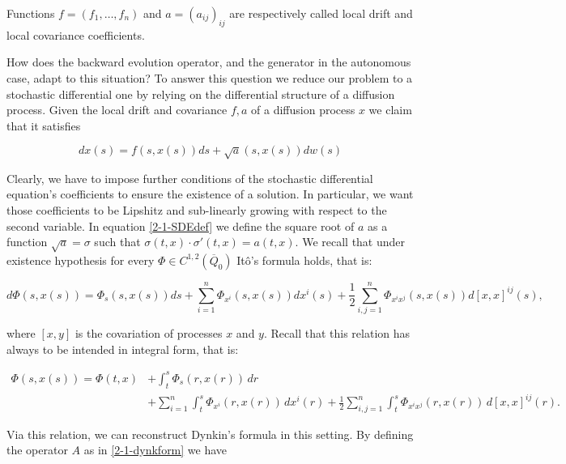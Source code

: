 Functions $f=(f_1,\dots,f_n)$ and $a=(a_{ij})_{ij}$ are respectively called local drift and local covariance coefficients.

How does the backward evolution operator, and the generator in the autonomous case, adapt to this situation? 
To answer this question we reduce our problem to a stochastic differential one by relying on the differential structure of a diffusion process. 
Given the local drift and covariance $f,a$ of a diffusion process $x$ we claim that it satisfies

\begin{equation}\label{2-1-SDEdef}
    dx(s) = f(s,x(s))ds + \sqrt{a}(s,x(s))dw(s) 
\end{equation}

Clearly, we have to impose further conditions of the stochastic differential equation's coefficients to ensure the existence of a solution. 
In particular, we want those coefficients to be Lipshitz and sub-linearly growing with respect to the second variable. In equation \eqref{2-1-SDEdef} we define the square root of $a$ as a function $\sqrt{a}=\sigma$ such that $\sigma(t,x)\cdot\sigma'(t,x) = a(t,x)$. We recall that under existence hypothesis for every $\Phi\in C^{1,2}(\overline{Q}_0)$ It\^o's formula holds, that is:

\begin{equation}\label{2-1-itotox}
    d\Phi(s,x(s)) = \Phi_s(s,x(s))ds + \sum_{i=1}^n \Phi_{x^i}(s,x(s)) dx^i(s) + \frac{1}{2}\sum_{i,j=1}^n \Phi_{x^ix^j}(s,x(s)) d[x,x]^{ij}(s),
\end{equation}

where $[x,y]$ is the covariation of processes $x$ and $y$. Recall that this relation has always to be intended in integral form, that is:

\begin{equation}
    \begin{aligned}
        \Phi(s,x(s)) = \Phi(t,x) & + \int_t^s\Phi_s(r,x(r))\,dr \\
        & + \sum_{i=1}^n \int_t^s \Phi_{x^i}(r,x(r))\,dx^i(r) + \frac{1}{2}\sum_{i,j=1}^n \int_t^s\Phi_{x^ix^j}(r,x(r))\,d[x,x]^{ij}(r).
    \end{aligned}
\end{equation}

Via this relation, we can reconstruct Dynkin's formula in this setting. By defining the operator $A$ as in \eqref{2-1-dynkform} we have

